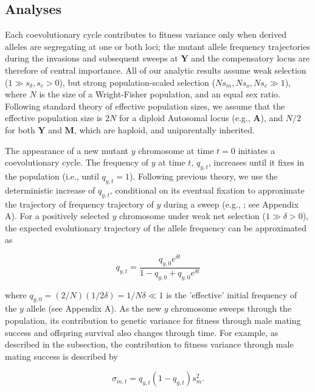 \documentclass{article}
\begin{document}
\subsection{Analyses} \label{subsec:Analyses}

Each coevolutionary cycle contributes to fitness variance only when derived alleles are segregating at one or both loci; the mutant allele frequency trajectories during the invasions and subsequent sweeps at $\mathbf{Y}$ and the compensatory locus are therefore of central importance. All of our analytic results assume weak selection ($1 \gg s_{\delta}, s_c > 0$), but strong population-scaled selection ($N s_m, N s_o, N s_c \gg 1$), where $N$ is the size of a Wright-Fisher population, and an equal sex ratio. Following standard theory of effective population sizes, we assume that the effective population size is $2N$ for a diploid Autosomal locus (e.g., $\mathbf{A}$), and $N/2$ for both $\mathbf{Y}$ and $\mathbf{M}$, which are haploid, and uniparentally inherited.

The appearance of a new mutant $y$ chromosome at time $t = 0$ initiates a coevolutionary cycle. The frequency of $y$ at time $t$, $q_{y,t}$, increases until it fixes in the population (i.e., until $q_{y,t} = 1$). Following previous theory, we use the deterministic increase of $q_{y,t}$, conditional on its eventual fixation to approximate the trajectory of frequency trajectory of $y$ during a sweep (e.g., \citealt{MaynardSmith1976,Ewens2004}; see Appendix A). For a positively selected $y$ chromosome under weak net selection ($1 \gg \delta > 0$), the expected evolutionary trajectory of the allele frequency can be approximated as 

\begin{equation} \label{eq:qyt}
	q_{y,t} = \frac{q_{y,0} e^{\delta t}} {1 - q_{y,0} + q_{y,0} e^{\delta t}}
\end{equation} 

\noindent where $q_{y,0} = (2/N)(1/2 \delta) = 1/N \delta \ll 1$ is the 'effective' initial frequency of the $y$ allele \citep{MaynardSmith1976,Ewens2004} (see Appendix A). As the new $y$ chromosome sweeps through the population, its contribution to genetic variance for fitness through male mating success and offspring survival also changes through time. For example, as described in the  subsection, the contribution to fitness variance through male mating success is described by 

\begin{equation} \label{eq:sigma-qyt}
	\sigma_{m,t} = q_{y,t}(1 - q_{y,t})s_{m}^{2}.
\end{equation} 
\end{document}
